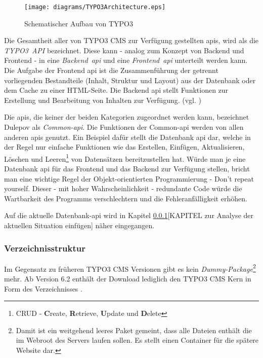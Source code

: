 \begin{figure}[H]
	\centering
	\texttt{[image: diagrams/TYPO3Architecture.eps]}
	\caption{Schematischer Aufbau von TYPO3}
	\label{fig:typo3Architecture}
\end{figure}

Die Gesamtheit aller von TYPO3 CMS zur Verfügung gestellten \gls{api}s, wird als die \mbox{\textit{TYPO3 API}} bezeichnet. Diese kann - analog zum Konzept von Backend und Frontend - in eine \mbox{\textit{Backend \gls{api}}} und eine \mbox{\textit{Frontend \gls{api}}} unterteilt werden kann. Die Aufgabe der Frontend \gls{api} ist die Zusammenführung der getrennt vorliegenden Bestandteile (Inhalt, Struktur und Layout) aus der Datenbank oder dem Cache zu einer HTML-Seite. Die Backend \gls{api} stellt Funktionen zur Erstellung und Bearbeitung von Inhalten zur Verfügung. (vgl. \cite[S. 5 ff.]{book:dulepovTypo32008})

Die \gls{api}s, die keiner der beiden Kategorien zugeordnet werden kann, bezeichnet Dulepov \cite[S. 5 ff.]{book:dulepovTypo32008} als \mbox{\textit{Common-\gls{api}}}. Die Funktionen der Common-\gls{api} werden von allen anderen \gls{api}s genutzt. Ein Beispiel dafür stellt die Datenbank \gls{api} dar, welche in der Regel nur einfache Funktionen wie das Erstellen, Einfügen, Aktualisieren, Löschen und Leeren\footnote{CRUD - {\bfseries C}reate, {\bfseries R}etrieve, {\bfseries U}pdate und {\bfseries D}elete} von Datensätzen bereitzustellen hat. Würde man je eine Datenbank \gls{api} für das Frontend und das Backend zur Verfügung stellen, bricht man eine wichtige Regel der Objekt-orientierten Programmierung - Don't repeat yourself. Dieser - mit hoher Wahrscheinlichkeit - redundante Code würde die Wartbarkeit des Programms verschlechtern und die Fehleranfälligkeit erhöhen.

Auf die aktuelle Datenbank-\gls{api} wird in Kapitel \ref{}[KAPITEL zur Analyse der aktuellen Situation einfügen] näher eingegangen.

\subsubsection{Verzeichnisstruktur}

Im Gegensatz zu früheren TYPO3 CMS Versionen gibt es kein \mbox{\textit{Dummy-Package}}\footnote{Damit ist ein weitgehend leeres Paket gemeint, dass alle Dateien enthält die im Web\-root des Servers laufen sollen. Es stellt einen Container für die spätere Website dar.} mehr. Ab Version 6.2 enthält der Download lediglich den TYPO3 CMS Kern in Form des Verzeichnisses .

